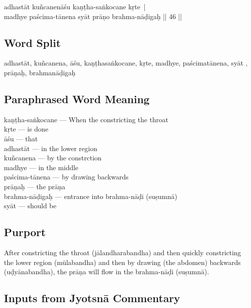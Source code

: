 \begin{shloka}
adhastāt kuñcanenāśu kaṇṭha-saṅkocane kṛte |\\
madhye paścima-tānena syāt prāṇo brahma-nāḍigaḥ || 46 ||
\end{shloka}

\subsection*{Word Split}

adhastāt, kuñcanena, āśu, kaṇṭhasaṅkocane, kṛte, madhye, paścimatānena, syāt , prāṇaḥ, brahmanāḍigaḥ

\subsection*{Paraphrased Word Meaning}

\begin{multicols}{2}
kaṇṭha-saṅkocane ---  When the constricting the throat \\
kṛte --- is done \\
āśu --- that \\
adhastāt ---  in the lower region \\
kuñcanena --- by the constrction \\
madhye --- in the middle \\
paścima-tānena ---  by drawing backwards \\
prāṇaḥ --- the prāṇa\\
brahma-nāḍigaḥ --- entrance into brahma-nāḍi (suṣumnā) \\
syāt --- should be
\end{multicols}

\subsection*{Purport}

After constricting the throat (jālandharabandha) and then quickly constricting the lower region (mūlabandha) and then by drawing (the abdomen) backwards (uḍyānabandha), the prāṇa will flow in the brahma-nāḍi (suṣumnā).

\subsection*{Inputs from Jyotsnā Commentary}

